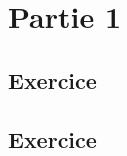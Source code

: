 \documentclass[oneside,12pt]{article}          %
\begin{document}
\section{Partie 1}

\subsection{Exercice}

\subsection{Exercice}
\end{document}
